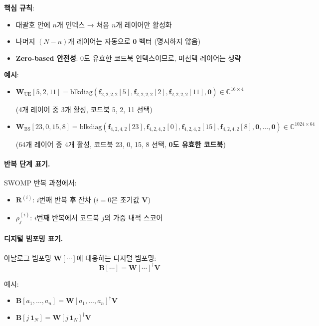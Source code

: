 \documentclass[10pt]{article}
\begin{document}
\textbf{핵심 규칙}:
\begin{itemize}
    \item 대괄호 안에 $n$개 인덱스 → 처음 $n$개 레이어만 활성화
    \item 나머지 $(N-n)$개 레이어는 자동으로 $\mathbf{0}$ 벡터 (명시하지 않음)
    \item \textbf{Zero-based 안전성}: $0$도 유효한 코드북 인덱스이므로, 미선택 레이어는 생략
\end{itemize}

\textbf{예시}:
\begin{itemize}
    \item $\mathbf{W}_{\text{UE}}[5, 2, 11] = \text{blkdiag}(\mathbf{f}_{2,2,2,2}[5], \mathbf{f}_{2,2,2,2}[2], \mathbf{f}_{2,2,2,2}[11], \mathbf{0}) \in \mathbb{C}^{16 \times 4}$ 
    
    (4개 레이어 중 3개 활성, 코드북 5, 2, 11 선택)
    \item $\mathbf{W}_{\text{BS}}[23, 0, 15, 8] = \text{blkdiag}(\mathbf{f}_{4,2,4,2}[23], \mathbf{f}_{4,2,4,2}[0], \mathbf{f}_{4,2,4,2}[15], \mathbf{f}_{4,2,4,2}[8], \mathbf{0}, \ldots, \mathbf{0}) \in \mathbb{C}^{1024 \times 64}$
    
    (64개 레이어 중 4개 활성, 코드북 23, 0, 15, 8 선택, \textbf{0도 유효한 코드북})
\end{itemize}

\paragraph{반복 단계 표기.}
SWOMP 반복 과정에서:
\begin{itemize}
    \item $\mathbf{R}^{(i)}$: $i$번째 반복 \textbf{후} 잔차 ($i=0$은 초기값 $\mathbf{V}$)
    \item $\rho_j^{(i)}$: $i$번째 반복에서 코드북 $j$의 가중 내적 스코어
\end{itemize}

\paragraph{디지털 빔포밍 표기.}
아날로그 빔포밍 $\mathbf{W}[\cdots]$에 대응하는 디지털 빔포밍:
\begin{equation}
\mathbf{B}[\cdots] = \mathbf{W}[\cdots]^{\dagger} \mathbf{V}
\end{equation}

예시:
\begin{itemize}
    \item $\mathbf{B}[a_1, \ldots, a_n] = \mathbf{W}[a_1, \ldots, a_n]^{\dagger} \mathbf{V}$
    \item $\mathbf{B}[j\,\mathbf{1}_N] = \mathbf{W}[j\,\mathbf{1}_N]^{\dagger} \mathbf{V}$
\end{itemize}
\end{document}
